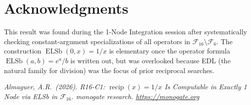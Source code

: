 \documentclass[12pt,a4paper]{article}
\theoremstyle{definition}
\newcommand{\ELSb}{\operatorname{ELSb}}
\newcommand{\recip}{\operatorname{recip}}
\begin{document}
\section*{Acknowledgments}

This result was found during the 1-Node Integration session after
systematically checking constant-argument specializations of all operators
in $\mathcal{F}_{16}\setminus\mathcal{F}_6$.
The construction $\ELSb(0,x) = 1/x$ is elementary once the operator
formula $\ELSb(a,b) = e^a/b$ is written out, but was overlooked because
EDL (the natural family for division) was the focus of prior reciprocal
searches.

\bigskip
\noindent\textit{Almaguer, A.R.\ (2026).
R16-C1: $\recip(x) = 1/x$ Is Computable in Exactly 1 Node via ELSb in $\mathcal{F}_{16}$.
monogate research. \url{https://monogate.org}}
\end{document}
